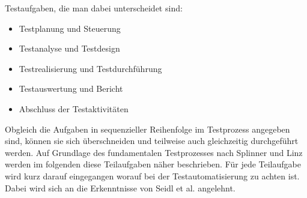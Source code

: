 Testaufgaben, die man dabei unterscheidet sind:

\begin{itemize}
	  \itemsep0pt
      \item Testplanung und Steuerung
      \item Testanalyse und Testdesign
      \item Testrealisierung und Testdurchführung
      \item Testauswertung und Bericht
      \item Abschluss der Testaktivitäten       
\end{itemize}

Obgleich die Aufgaben in sequenzieller Reihenfolge im Testprozess angegeben sind, können sie sich überschneiden und teilweise auch gleichzeitig durchgeführt werden. Auf Grundlage des fundamentalen Testprozesses nach Splinner und Linz werden im folgenden diese Teilaufgaben näher beschrieben. \cite[S.20ff]{spillner_basiswissen_2007}
Für jede Teilaufgabe wird kurz darauf eingegangen worauf bei der Testautomatisierung zu achten ist. Dabei wird sich an die Erkenntnisse von Seidl et al. angelehnt. \cite[Seite 9 ff.]{seidl_basiswissen_2012}

